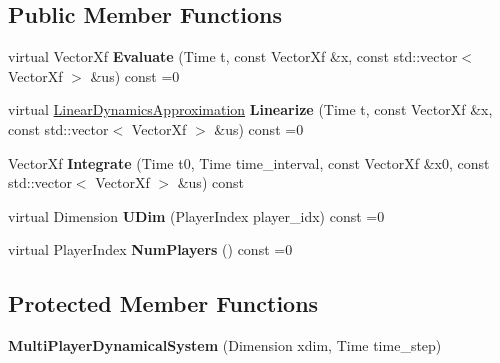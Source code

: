 \subsection*{Public Member Functions}
\begin{DoxyCompactItemize}
\item 
virtual Vector\+Xf {\bfseries Evaluate} (Time t, const Vector\+Xf \&x, const std\+::vector$<$ Vector\+Xf $>$ \&us) const =0\hypertarget{classilqgames_1_1_multi_player_dynamical_system_a66a5536c8b8995b26f1d5520026a6ad8}{}\label{classilqgames_1_1_multi_player_dynamical_system_a66a5536c8b8995b26f1d5520026a6ad8}

\item 
virtual \hyperlink{structilqgames_1_1_linear_dynamics_approximation}{Linear\+Dynamics\+Approximation} {\bfseries Linearize} (Time t, const Vector\+Xf \&x, const std\+::vector$<$ Vector\+Xf $>$ \&us) const =0\hypertarget{classilqgames_1_1_multi_player_dynamical_system_ace8dae90eae7aa2e0a327855f77c38d1}{}\label{classilqgames_1_1_multi_player_dynamical_system_ace8dae90eae7aa2e0a327855f77c38d1}

\item 
Vector\+Xf {\bfseries Integrate} (Time t0, Time time\+\_\+interval, const Vector\+Xf \&x0, const std\+::vector$<$ Vector\+Xf $>$ \&us) const \hypertarget{classilqgames_1_1_multi_player_dynamical_system_afddeafb94e74a19cdba2736f4a7a8050}{}\label{classilqgames_1_1_multi_player_dynamical_system_afddeafb94e74a19cdba2736f4a7a8050}

\item 
virtual Dimension {\bfseries U\+Dim} (Player\+Index player\+\_\+idx) const =0\hypertarget{classilqgames_1_1_multi_player_dynamical_system_a646bbfa93e8f222a223053a4e939aed0}{}\label{classilqgames_1_1_multi_player_dynamical_system_a646bbfa93e8f222a223053a4e939aed0}

\item 
virtual Player\+Index {\bfseries Num\+Players} () const =0\hypertarget{classilqgames_1_1_multi_player_dynamical_system_ad9ef05f4bd53279bec609525e7ac4dd7}{}\label{classilqgames_1_1_multi_player_dynamical_system_ad9ef05f4bd53279bec609525e7ac4dd7}

\end{DoxyCompactItemize}
\subsection*{Protected Member Functions}
\begin{DoxyCompactItemize}
\item 
{\bfseries Multi\+Player\+Dynamical\+System} (Dimension xdim, Time time\+\_\+step)\hypertarget{classilqgames_1_1_multi_player_dynamical_system_a11acc6ee2c06ce966f32017c5711d518}{}\label{classilqgames_1_1_multi_player_dynamical_system_a11acc6ee2c06ce966f32017c5711d518}

\end{DoxyCompactItemize}

